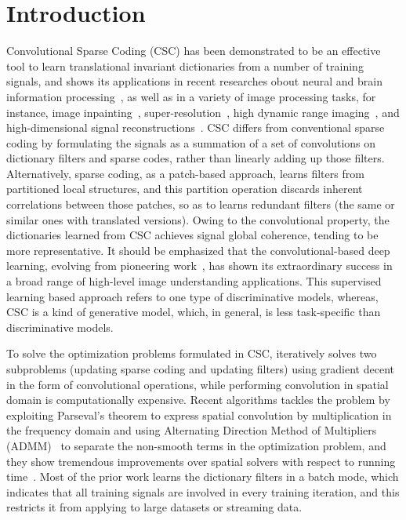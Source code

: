 \section{Introduction}
Convolutional Sparse Coding (CSC) has been demonstrated to be an effective tool to learn translational invariant dictionaries from a number of training signals, and shows its applications in recent researches obout neural and brain information processing~\cite{jas2017learning,peter2017sparse}, as well as in a variety of image processing tasks, for instance, image inpainting~\cite{heide2015fast}, super-resolution~\cite{gu2015convolutional}, high dynamic range imaging~\cite{serrano2016convolutional}, and high-dimensional signal reconstructions~\cite{choudhury2017consensus,bibi2017high}. CSC differs from conventional sparse coding by formulating the signals as a summation of a set of convolutions on dictionary filters and sparse codes, rather than linearly adding up those filters. Alternatively, sparse coding, as a patch-based approach, learns filters from partitioned local structures, and this partition operation discards inherent correlations between those patches, so as to learns redundant filters (the same or similar ones with translated versions). Owing to the convolutional property, the dictionaries learned from CSC achieves signal global coherence, tending to be more representative. It should be emphasized that the convolutional-based deep learning, evolving from pioneering work~\cite{lecun1998gradient,kavukcuoglu2010learning,krizhevsky2012imagenet}, has shown its extraordinary success in a broad range of high-level image understanding applications. This supervised learning based approach refers to one type of discriminative models, whereas, CSC is a kind of generative model, which, in general, is less task-specific than discriminative models.

To solve the optimization problems formulated in CSC, \cite{zeiler2010deconvolutional} iteratively solves two subproblems (updating sparse coding and updating filters) using gradient decent in the form of convolutional operations, while performing convolution in spatial domain is computationally expensive. Recent algorithms tackles the problem by exploiting Parseval's theorem to express spatial convolution by multiplication in the frequency domain and using Alternating Direction Method of Multipliers (ADMM)~\cite{boyd2011distributed} to separate the non-smooth terms in the optimization problem, and they show tremendous improvements over spatial solvers with respect to running time~\cite{bristow2013fast,heide2015fast,wohlberg2016efficient}. Most of the prior work learns the dictionary filters in a batch mode, which indicates that all training signals are involved in every training iteration, and this restricts it from applying to large datasets or streaming data.

